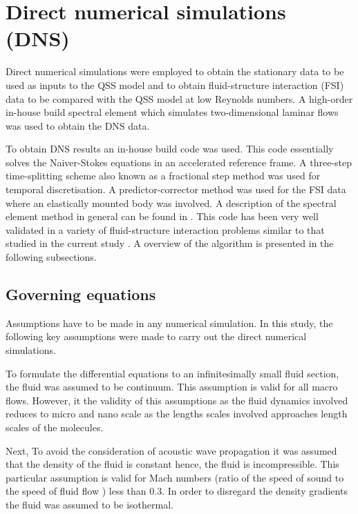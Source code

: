\section{Direct numerical simulations (DNS)}

Direct numerical simulations were employed to obtain the stationary data to be used as inputs to the QSS model and to obtain  fluid-structure interaction (FSI) data to be compared with the QSS model at low Reynolds numbers. A high-order in-house build spectral element which simulates two-dimensional laminar flows was used to obtain the DNS data.


To obtain DNS results an in-house build code was used. This code essentially solves the Naiver-Stokes equations in an accelerated reference frame. A three-step time-splitting scheme also known as a fractional step method was used for temporal discretisation. A predictor-corrector method was used for the FSI data where an elastically mounted body was involved. A description of the spectral element method in general can be found in \citet{karniadakis2005}. This code has been very well validated in a variety of fluid-structure interaction problems similar to that studied in the current study \citep{Leontini2007a,Griffith2011,Leontini2011,Leontini2013}. A overview of the algorithm is presented in the following subsections. 

\subsection{Governing equations}
 
 Assumptions have to be made in any numerical simulation. In this study, the following key assumptions were made to carry out the direct numerical simulations. 
 
 To formulate the differential equations to an infinitesimally small fluid section, the fluid was assumed to be continuum. This assumption is valid for all macro flows. However, it the validity of this assumptions as the fluid dynamics involved reduces to micro and nano scale as the lengths scales involved approaches length scales of the molecules.
 
 Next, To avoid the consideration of acoustic wave propagation it was assumed that the density of the fluid is constant hence, the fluid is incompressible. This particular assumption is valid for Mach numbers (ratio of the speed of sound to the speed of fluid flow ) less than 0.3. In order to disregard the density gradients the fluid was assumed to be isothermal. 
 
